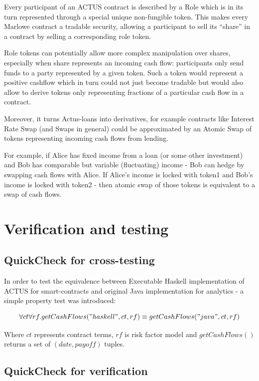 \documentclass[runningheads]{llncs}
\begin{document}
Every participant of an ACTUS contract is described by a Role which
is in its turn represented through a special unique non-fungible token.
This makes every Marlowe contract a tradable security, allowing a
participant to sell its ``share'' in a contract by selling a corresponding
role token.

Role tokens can potentially allow more complex manipulation over shares,
especially when share represents an incoming cash flow: participants
only send funds to a party represented by a given token. Such a token
would represent a positive cashflow which in turn could not just become
tradable but would also allow to derive tokens only representing fractions
of a particular cash flow in a contract.

Moreover, it turns Actus-loans into derivatives, for example contracts
like Interest Rate Swap (and Swaps in general) could be approximated
by an Atomic Swap of tokens representing incoming cash flows from
lending.

For example, if Alice has fixed income from a loan (or some other
investment) and Bob has comparable but variable (fluctuating) income
- Bob can hedge by swapping cash flows with Alice. If Alice's income
is locked with token1 and Bob's income is locked with token2 - then
atomic swap of those tokens is equivalent to a swap of cash flows.

\section{Verification and testing}
\label{verification}

\subsection{QuickCheck for cross-testing}

In order to test the equivalence between Executable Haskell implementation
of ACTUS for smart-contracts and original Java implementation for
analytics - a simple property test was introduced:

\smallskip
\noindent 
\begin{equation}
\forall ct\forall rf.getCashFlows("haskell",ct,rf)\equiv getCashFlows("java",ct,rf)
\end{equation}

Where $ct$ represents contract terms, $rf$ is risk factor model and
$getCashFlows()$ returns a set of $(date,payoff)$ tuples.

\subsection{QuickCheck for verification}
\end{document}

